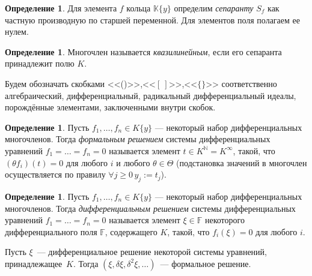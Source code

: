 \documentclass[16pt]{article}
\renewcommand{\ge}{\geqslant} %
\theoremstyle{plain1}
\theoremstyle{plain2}
\theoremstyle{plain}
\theoremstyle{plain3}
\theoremstyle{definition}
\newtheorem{definition}[theorem2]{Определение}
\theoremstyle{remark}
\begin{document}
\begin{definition}
Для элемента $f$ кольца $\mathbb{K}\{y\}$ определим \emph{сепаранту} $S_f$
как частную производную по старшей переменной. Для элементов поля полагаем ее нулем.
\end{definition}

\begin{definition} Многочлен называется \emph{квазилинейным}, если
его сепаранта принадлежит полю $K$.
\end{definition}



Будем обозначать скобками <<()>>,<<$[~]$>>,<<$\{\}$>> соответственно
алгебраический, дифференциальный, радикальный дифференциальный
идеалы, порождённые элементами, заключенными внутри скобок.


\begin{definition}
Пусть $f_1,\ldots,f_n\in K\{y\}$ --- некоторый набор
дифференциальных многочленов. Тогда \emph{формальным решением}
системы дифференциальных уравнений $f_1=\ldots =f_n=0$ называется
элемент $t\in K^{\mathbb{N}}= K^{\infty}$, такой, что $ (\theta f_i)(t)=0$ для
любого $i$ и любого $\theta\in\Theta$ (подстановка значений в
многочлен осуществляется по правилу $\forall j\ge 0 \, y_j:=t_j$).
\end{definition}




\begin{definition}
Пусть $f_1,\ldots,f_n\in K\{y\}$ --- некоторый
набор дифференциальных многочленов. Тогда \emph{дифференциальным
решением} системы дифференциальных уравнений $f_1=\ldots =f_n=0$
называется элемент $\xi \in \mathbb{F}$ некоторого дифференциального
поля $\mathbb{F}$, содержащего $K$, такой, что $ f_i(\xi)=0$ для
любого $i$.
\end{definition}

Пусть $\xi$~--- дифференциальное решение некоторой системы уравнений, принадлежащее~$K$.
Тогда $(\xi, \delta \xi, \delta^2 \xi, \ldots)$~--- формальное решение.
\end{document}
